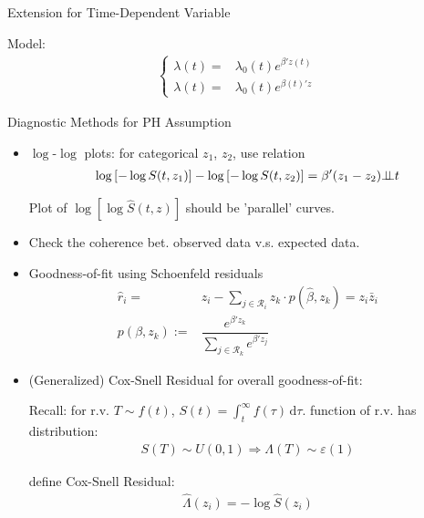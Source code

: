 \begin{point}
    Extension for Time-Dependent Variable
\end{point}

Model:
\begin{align}
    \begin{cases}
        \lambda (t)=&\lambda _0(t)e^{\beta 'z(t)}\\
        \lambda (t)=&\lambda _0(t)e^{\beta (t) 'z}
    \end{cases}
\end{align}

\begin{point}
    Diagnostic Methods for PH Assumption
\end{point}

\begin{itemize}[topsep=2pt,itemsep=0pt]
    \item $ \log $-$ \log $ plots: for categorical $ z_1 $, $ z_2 $, use relation
    \begin{align}
        \log\left[-\log S(t,z_1)\right] -\log\left[-\log S(t,z_2)\right] =\beta '(z_1-z_2)\bot\!\!\!\bot t
    \end{align}
    
    Plot of $ \log\left[\log \hat{S}(t,z)\right] $ should be 'parallel' curves.
    
    \item Check the coherence bet. observed data v.s. expected data.
    \item Goodness-of-fit using Schoenfeld residuals
    \begin{align}
        \hat{r}_i=&z_i-\sum_{j\in\mathcal{R}_i}z_k\cdot p(\hat{\beta },z_k)=z_i\bar{z}_i\\
        p(\beta ,z_k):=&\dfrac{e^{\beta 'z_k}}{\sum_{j\in\mathcal{R}_k}e^{\beta 'z_j}} 
    \end{align}
    \item (Generalized) Cox-Snell Residual for overall goodness-of-fit: 
    
    Recall: for r.v. $ T\sim f(t) $, $ S(t)=\int _t^\infty f(\tau) \,\mathrm{d}\tau $. function of r.v. has distribution:
    \begin{align}
        S(T)\sim U(0,1)\Rightarrow \Lambda (T)\sim \varepsilon (1) 
    \end{align}

    define Cox-Snell Residual:
    \begin{align}
        \hat{\Lambda }(z_i)=-\log \hat{S}(z_i) 
    \end{align}


\end{itemize}
